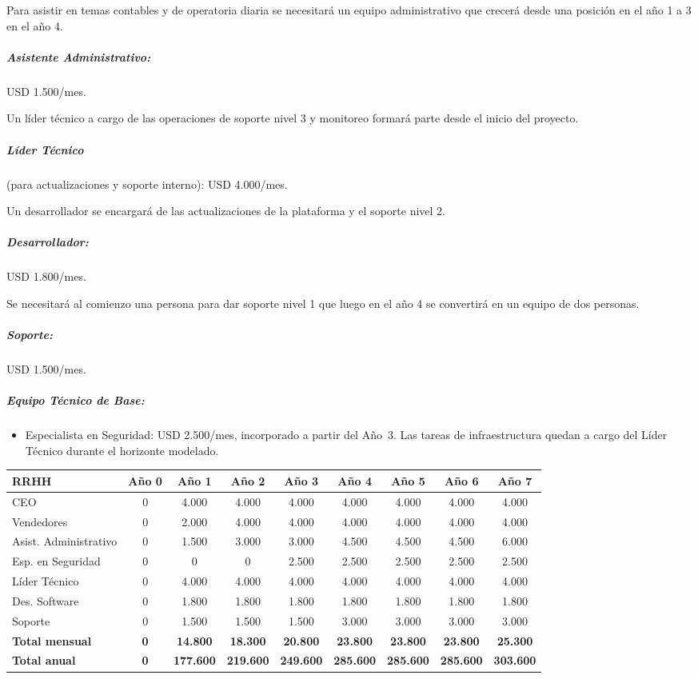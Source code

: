 Para asistir en temas contables y de operatoria diaria se necesitará un equipo administrativo que crecerá desde una posición en el año 1 a 3 en el año 4.

\subparagraph{Asistente Administrativo:} USD 1.500/mes.

Un líder técnico a cargo de las operaciones de soporte nivel 3 y monitoreo formará parte desde el inicio del proyecto.

\subparagraph{Líder Técnico} (para actualizaciones y soporte interno): USD 4.000/mes.

Un desarrollador se encargará de las actualizaciones de la plataforma y el soporte nivel 2.

\subparagraph{Desarrollador:} USD 1.800/mes.

Se necesitará al comienzo una persona para dar soporte nivel 1 que luego en el año 4 se convertirá en un equipo de dos personas.

\subparagraph{Soporte:} USD 1.500/mes.

\subparagraph{Equipo Técnico de Base:}
\begin{itemize}
    \item Especialista en Seguridad: USD 2.500/mes, incorporado a partir del Año~3. Las tareas de infraestructura quedan a cargo del Líder Técnico durante el horizonte modelado.
\end{itemize}

\begin{center}
\footnotesize
\begin{adjustbox}{width=\textwidth,center}
\begin{tabular}{lcccccccc}
\hline
\textbf{RRHH} & \textbf{Año 0} & \textbf{Año 1} & \textbf{Año 2} & \textbf{Año 3} & \textbf{Año 4} & \textbf{Año 5} & \textbf{Año 6} & \textbf{Año 7} \\
\hline
CEO & 0 & 4.000 & 4.000 & 4.000 & 4.000 & 4.000 & 4.000 & 4.000 \\
Vendedores & 0 & 2.000 & 4.000 & 4.000 & 4.000 & 4.000 & 4.000 & 4.000 \\
Asist. Administrativo & 0 & 1.500 & 3.000 & 3.000 & 4.500 & 4.500 & 4.500 & 6.000 \\
Esp. en Seguridad & 0 & 0 & 0 & 2.500 & 2.500 & 2.500 & 2.500 & 2.500 \\
Líder Técnico & 0 & 4.000 & 4.000 & 4.000 & 4.000 & 4.000 & 4.000 & 4.000 \\
Des. Software & 0 & 1.800 & 1.800 & 1.800 & 1.800 & 1.800 & 1.800 & 1.800 \\
Soporte & 0 & 1.500 & 1.500 & 1.500 & 3.000 & 3.000 & 3.000 & 3.000 \\
\hline
\textbf{Total mensual} & \textbf{0} & \textbf{14.800} & \textbf{18.300} & \textbf{20.800} & \textbf{23.800} & \textbf{23.800} & \textbf{23.800} & \textbf{25.300} \\
\hline
\textbf{Total anual} & \textbf{0} & \textbf{177.600} & \textbf{219.600} & \textbf{249.600} & \textbf{285.600} & \textbf{285.600} & \textbf{285.600} & \textbf{303.600} \\
\hline
\end{tabular}
\end{adjustbox}
\end{center}


